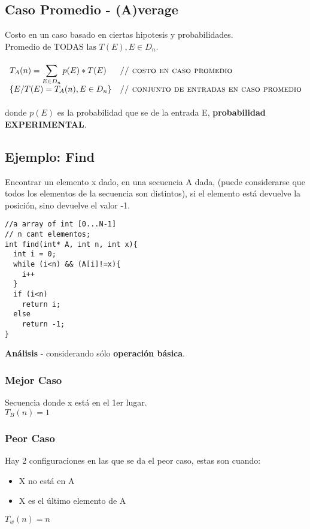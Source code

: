 \documentclass[a4paper,10pt]{article}
\begin{document}
\subsection{Caso Promedio - (A)verage}
Costo en un caso basado en ciertas hipotesis y probabilidades. \\
$\text{Promedio de TODAS las } T(E), E \in D_n$.\\\\
$\begin{array}{ll}
T_A(n) = \displaystyle\sum_{{E \in D_n}} p(E) * T(E) & \textsc{// costo en caso promedio} \\
\{E / T(E) = T_A(n), E \in D_n\} & \textsc{// conjunto de entradas en caso promedio}\\
\end{array}$\\\\
donde $p(E)$ es la probabilidad que se de la entrada E, \textbf{probabilidad EXPERIMENTAL}.\\

\subsection{Ejemplo: Find}
Encontrar un elemento x dado, en una secuencia A dada, (puede considerarse que todos los
elementos de la secuencia son distintos), si el elemento está devuelve la posición, sino devuelve el
valor -1.
\begin{verbatim}
//a array of int [0...N-1]
// n cant elementos;
int find(int* A, int n, int x){
  int i = 0;
  while (i<n) && (A[i]!=x){
    i++
  }
  if (i<n)
    return i;
  else
    return -1;
}
\end{verbatim}
\textbf{\large Análisis} - considerando sólo \textbf{operación básica}.
\subsubsection{Mejor Caso}
Secuencia donde x está en el 1er lugar.\\
$T_B(n) = 1$
\subsubsection{Peor Caso}
Hay 2 configuraciones en las que se da el peor caso, estas son cuando:
\begin{itemize}
  \item X no está en A
  \item X es el último elemento de A
\end{itemize}
$T_w(n) = n$
\end{document}
